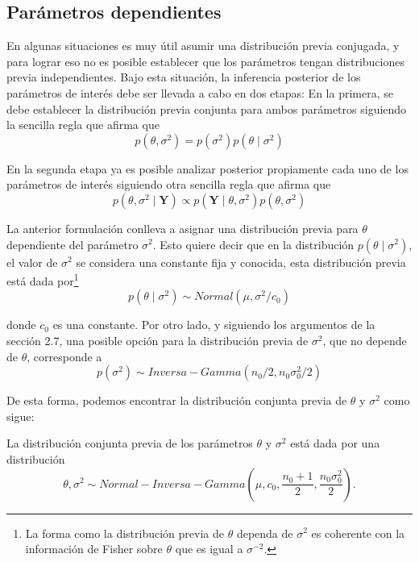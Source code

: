 \subsection{Parámetros dependientes}

En algunas situaciones es muy útil asumir una distribución previa conjugada, y para lograr eso no es posible establecer que los parámetros tengan distribuciones previa independientes. Bajo esta situación, la inferencia posterior de los parámetros de interés debe ser llevada a cabo en dos etapas: En la primera, se debe establecer la distribución previa conjunta para ambos parámetros siguiendo la sencilla regla que afirma que
\begin{equation*}
p(\theta,\sigma^2)=p(\sigma^2)p(\theta \mid \sigma^2)
\end{equation*}

En la segunda etapa ya es posible analizar posterior propiamente cada uno de los parámetros de interés siguiendo otra sencilla regla que afirma que
\begin{equation*}
p(\theta,\sigma^2 \mid \mathbf{Y})\propto p(\mathbf{Y} \mid \theta,\sigma^2)p(\theta,\sigma^2)
\end{equation*}

La anterior formulación conlleva a asignar una distribución previa para $\theta$ dependiente del parámetro $\sigma^2$. Esto quiere decir que en la distribución $p(\theta \mid \sigma^2)$, el valor de $\sigma^2$ se considera una constante fija y conocida, esta distribución previa está dada por\footnote{La forma como la distribución previa de $\theta$ dependa de $\sigma^2$ es coherente con la información de Fisher sobre $\theta$ que es igual a $\sigma^{-2}$.}
\begin{equation*}
p(\theta \mid \sigma^2)\sim Normal(\mu,\sigma^2/c_0)
\end{equation*}

donde $c_0$ es una constante. Por otro lado, y siguiendo los argumentos de la sección 2.7, una posible opción para la distribución previa de $\sigma^2$, que no depende de $\theta$, corresponde a
\begin{equation*}
p(\sigma^2)\sim Inversa-Gamma(n_0/2,n_0\sigma^2_0/2)
\end{equation*}

De esta forma, podemos encontrar la distribución conjunta previa de $\theta$ y $\sigma^2$ como sigue:
\begin{Res}
La distribución conjunta previa de los parámetros $\theta$ y $\sigma^2$ está dada por una distribución
\begin{equation*}
\theta,\sigma^2 \sim Normal-Inversa-Gamma\left(\mu, c_0, \frac{n_0+1}{2},\frac{n_0\sigma^2_0}{2}\right).
\end{equation*}
\end{Res}

